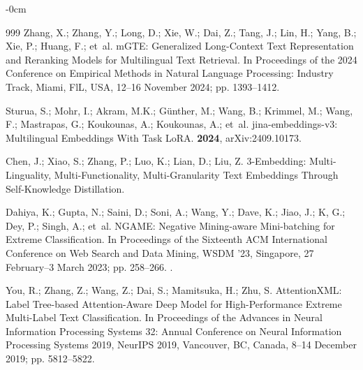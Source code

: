 \documentclass[make,article,accept,pdftex,moreauthors]{Definitions/mdpi}
\begin{document}
\begin{adjustwidth}{-\extralength}{0cm}
\begin{thebibliography}{999}
Zhang, X.; Zhang, Y.; Long, D.; Xie, W.; Dai, Z.; Tang, J.; Lin, H.; Yang, B.;
  Xie, P.; Huang, F.;  et~al.
\newblock mGTE: Generalized Long-Context Text Representation and Reranking
  Models for Multilingual Text Retrieval.
\newblock In Proceedings of the 2024 Conference on Empirical
  Methods in Natural Language Processing: Industry Track, Miami, FlL, USA, 12--16 November 2024; pp.
  1393--1412.

Sturua, S.; Mohr, I.; Akram, M.K.; Günther, M.; Wang, B.; Krimmel, M.; Wang,
  F.; Mastrapas, G.; Koukounas, A.; Koukounas, A.;  et~al.
\newblock jina-embeddings-v3: Multilingual Embeddings With Task LoRA.
 {\bf 2024}, arXiv:2409.10173.

Chen, J.; Xiao, S.; Zhang, P.; Luo, K.; Lian, D.; Liu, Z.
3-Embedding: Multi-Linguality, Multi-Functionality,
  Multi-Granularity Text Embeddings Through Self-Knowledge Distillation.
\newblock {}

Dahiya, K.; Gupta, N.; Saini, D.; Soni, A.; Wang, Y.; Dave, K.; Jiao, J.; K,
  G.; Dey, P.; Singh, A.;  et~al.
\newblock NGAME: Negative Mining-aware Mini-batching for Extreme
  Classification.
\newblock In Proceedings of the Sixteenth ACM International
  Conference on Web Search and Data Mining, WSDM '23, Singapore, 27 February--3 March 2023; 
  pp. 258--266.
.

You, R.; Zhang, Z.; Wang, Z.; Dai, S.; Mamitsuka, H.; Zhu, S.
\newblock AttentionXML: Label Tree-based Attention-Aware Deep Model for
  High-Performance Extreme Multi-Label Text Classification.
\newblock In Proceedings of the Advances in Neural Information Processing
  Systems 32: Annual Conference on Neural Information Processing Systems 2019,
  NeurIPS 2019, Vancouver, BC, Canada, 8--14 December 2019;
 pp. 5812--5822.


\end{thebibliography}
\end{adjustwidth}
\end{document}
